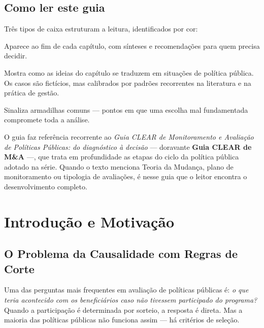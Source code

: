 \documentclass[12pt, a4paper, openany]{book}
\begin{document}
\section*{Como ler este guia}
Três tipos de caixa estruturam a leitura, identificados por cor:
\vspace{0.3cm}
\begin{notabox}
Aparece ao fim de cada capítulo, com sínteses e recomendações para quem
precisa decidir.
\end{notabox}
\begin{exemplobox}
Mostra como as ideias do capítulo se traduzem em situações de política
pública. Os casos são fictícios, mas calibrados por padrões recorrentes
na literatura e na prática de gestão.
\end{exemplobox}
\begin{atencaobox}
Sinaliza armadilhas comuns --- pontos em que uma escolha mal fundamentada
compromete toda a análise.
\end{atencaobox}
\vspace{0.5cm}
\noindent O guia faz referência recorrente ao \textit{Guia CLEAR de
Monitoramento e Avaliação de Políticas Públicas: do diagnóstico à decisão}
\citep{Lima2025} --- doravante \textbf{Guia CLEAR de M\&A} ---, que trata
em profundidade as etapas do ciclo da política pública adotado na série.
Quando o texto menciona Teoria da Mudança, plano de monitoramento ou
tipologia de avaliações, é nesse guia que o leitor encontra o
desenvolvimento completo.
\newpage

\tableofcontents
\newpage



\chapter{Introdu\c{c}\~ao e Motiva\c{c}\~ao}

\section{O Problema da Causalidade com Regras de Corte}

Uma das perguntas mais frequentes em avalia\c{c}\~ao de pol\'iticas p\'ublicas \'e: \textit{o que teria acontecido com os benefici\'arios caso n\~ao tivessem participado do programa?} Quando a participa\c{c}\~ao \'e determinada por sorteio, a resposta \'e direta. Mas a maioria das pol\'iticas p\'ublicas n\~ao funciona assim --- h\'a crit\'erios de sele\c{c}\~ao.
\end{document}
